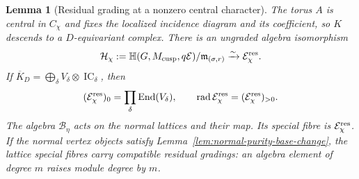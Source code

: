 \documentclass[11pt]{amsart}
\newtheorem{lemma}[theorem]{Lemma}
\theoremstyle{definition}
\theoremstyle{remark}
\newcommand{\IC}{\operatorname{IC}}
\begin{document}
\begin{lemma}[Residual grading at a nonzero central character]
\label{lem:residual-grading}
The torus $A$ is central in $C_\chi$ and fixes the localized incidence
diagram and its coefficient, so $K$ descends to a $D$-equivariant complex.
There is an ungraded algebra isomorphism
\[
 \mathcal H_\chi:=
 \mathbb H(G,M_{\rm cusp},q\mathcal E)/\mathfrak m_{(\sigma,r)}
 \xrightarrow{\sim}\mathcal E_\chi^{\rm res}.
\]
If $\overline K_D=\bigoplus_\delta V_\delta\otimes\IC_\delta$, then
\[
 (\mathcal E_\chi^{\rm res})_0
   =\prod_\delta\operatorname{End}(V_\delta),\qquad
 \operatorname{rad}\mathcal E_\chi^{\rm res}
   =(\mathcal E_\chi^{\rm res})_{>0}.
\]
The algebra $\mathcal B_\eta$ acts on the normal lattices and their map.
Its special fibre is $\mathcal E_\chi^{\rm res}$.
If the normal vertex objects satisfy
Lemma~\ref{lem:normal-purity-base-change}, the lattice special fibres
carry compatible residual gradings: an algebra element of degree $m$
raises module degree by $m$.
\end{lemma}
\end{document}
